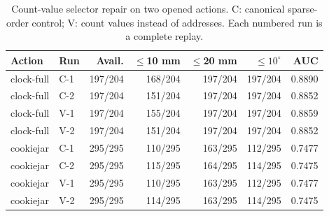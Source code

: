 \begin{table}[t]\centering\scriptsize
\caption{Count-value selector repair on two opened actions. C: canonical sparse-order control; V: count values instead of addresses. Each numbered run is a complete replay.}
\label{tab:bt-count-values}
\begin{tabular}{llrrrrr}\toprule
Action & Run & Avail. & $\leq$10 mm & $\leq$20 mm & $\leq10^\circ$ & AUC\\\midrule
clock-full & C-1 & 197/204 & 168/204 & 197/204 & 197/204 & 0.8890\\
clock-full & C-2 & 197/204 & 151/204 & 197/204 & 197/204 & 0.8852\\
clock-full & V-1 & 197/204 & 155/204 & 197/204 & 197/204 & 0.8859\\
clock-full & V-2 & 197/204 & 151/204 & 197/204 & 197/204 & 0.8852\\
cookiejar & C-1 & 295/295 & 110/295 & 163/295 & 112/295 & 0.7477\\
cookiejar & C-2 & 295/295 & 115/295 & 164/295 & 114/295 & 0.7475\\
cookiejar & V-1 & 295/295 & 110/295 & 163/295 & 112/295 & 0.7477\\
cookiejar & V-2 & 295/295 & 114/295 & 163/295 & 114/295 & 0.7475\\
\bottomrule\end{tabular}\end{table}

